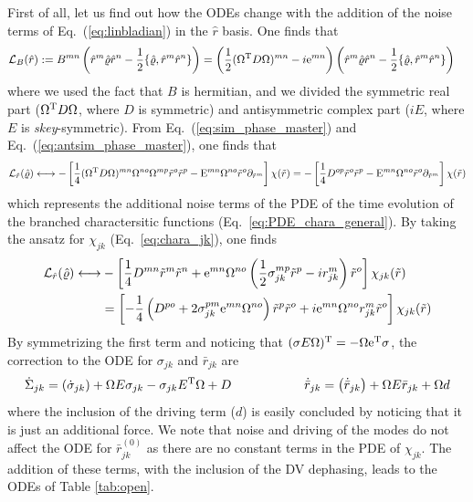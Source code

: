 \documentclass[%
reprint,
superscriptaddress,
nofootinbib,
 amsmath,amssymb,
prx,
floatfix,
]{revtex4-2}
\begin{document}
First of all, let us find out how the ODEs change with the addition of the noise terms of Eq.~(\ref{eq:linbladian}) in the $\hat{r}$ basis. One finds that
\begin{align*}
    \mathcal{L}_B (\hat{r}) &:=  B^{mn} \left(  \hat{r}^m \hat{\varrho} \hat{r}^n  - \frac{1}{2} \{ \hat{\varrho}, \hat{r}^m  \hat{r}^n \} \right) =     \left(\frac{1}{2}  (\Omega^{\rm T} D \Omega)^{mn} -  i  {\rm e}^{mn} \right) \left(  \hat{r}^m \hat{\varrho} \hat{r}^n  - \frac{1}{2} \{ \hat{\varrho}, \hat{r}^m  \hat{r}^n \} \right) 
\end{align*}
where we used the fact that $B$ is hermitian, and we divided the symmetric real part ($\Omega^{\rm T} D \Omega$, where $D$ is symmetric) and antisymmetric complex part ($i  E$, where $E$ is \textit{skey}-symmetric). From Eq.~(\ref{eq:sim_phase_master}) and Eq.~(\ref{eq:antsim_phase_master}), one finds that  
\begin{equation}
    \mathcal{L}_{\hat{r}}  (\hat{\varrho}) \longleftrightarrow - 
    \left[ \frac{1}{4} (\Omega^{\rm T} D \Omega)^{mn}  \Omega^{n o} \Omega^{m p} \tilde{r}^o \tilde{r}^p   -   {\rm E}^{mn} \Omega^{n o} \tilde{r}^o  \partial_{\tilde{r}^m}  \right] \chi (\tilde{r}) =  - 
    \left[ \frac{1}{4} D^{op} \tilde{r}^o \tilde{r}^p  -  {\rm E}^{mn} \Omega^{n o} \tilde{r}^o  \partial_{\tilde{r}^m}  \right] \chi (\tilde{r}) 
\end{equation}
which represents the additional noise terms of the PDE of the time evolution of the branched charactersitic functions (Eq.~\ref{eq:PDE_chara_general}). By taking the ansatz for $\chi_{jk}$ (Eq.~\ref{eq:chara_jk}), one finds 
\begin{align}
    \mathcal{L}_{\hat{r}} (\hat{\varrho}) \longleftrightarrow &-  \left[ \frac{1}{4}  D^{mn} \tilde{r}^m \tilde{r}^n  + {\rm e}^{mn} \Omega^{no}  \left( \frac{1}{2} \sigma_{jk}^{mp} \tilde{r}^{p} -  i r^m_{jk}  \right) \tilde{r}^o  \right] \chi_{jk} (\tilde{r}) \nonumber \\
    &=  \left[ - \frac{1}{4} \left( D^{po} + 2 \sigma_{jk}^{pm} {\rm e}^{mn}  \Omega^{no}     \right) \tilde{r}^p \tilde{r}^o  +  i   {\rm e}^{mn} \Omega^{no}  r^m_{jk}   \tilde{r}^o  \right] \chi_{jk} (\tilde{r}) \nonumber 
\end{align}
By symmetrizing the first term and noticing that $ (\sigma E  \Omega )^{\rm T} = -  \Omega {\rm e}^{\rm T} \sigma $, the correction to the ODE for $\sigma_{jk}$ and $\bar{r}_{jk}$ are
\begin{equation}
\dot{\Sigma}_{jk} = \left( \dot{\sigma}_{jk} \right) + \Omega E  \sigma_{jk}  -  \sigma_{jk} E^{\rm T} \Omega + D \hspace{2cm} \dot{\bar{r}}_{jk} = \left( \dot{\bar{r}}_{jk} \right) + \Omega E \bar{r}_{jk} + \Omega d
\end{equation}
where the inclusion of the driving term ($d$) is easily concluded by noticing that it is just an additional force. We note that noise and driving of the modes do not affect the ODE for $\bar{r}_{jk}^{(0)}$ as there are no constant terms in the PDE of $\chi_{jk}$. 
The addition of these terms, with the inclusion of the DV dephasing, leads to the ODEs of Table \ref{tab:open}. 
\end{document}
